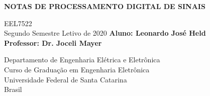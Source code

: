\documentclass[12pt, a4paper]{report}
\begin{document}
\begin{titlepage}
    \begin{center}
        \vspace*{1cm}
        \Huge
        \textbf{NOTAS DE PROCESSAMENTO DIGITAL DE SINAIS}
             
        \vspace{3cm}
        EEL7522 \\
        Segundo Semestre Letivo de 2020 
        \vfill
        \Large
        \textbf{Aluno: Leonardo José Held}\\
        \textbf{Professor: Dr. Joceli Mayer}
        \vspace{0.8cm}

        Departamento de Engenharia Elétrica e Eletrônica\\
        Curso de Graduação em Engenharia Eletrônica\\
        Universidade Federal de Santa Catarina\\
        Brasil\\                     
    \end{center}
 \end{titlepage}

 \Large

 \tableofcontents

 
\end{document}
